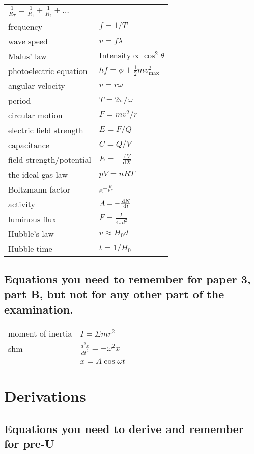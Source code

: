 \documentclass[revision-guide.tex]{subfiles}
\begin{document}
\begin{longtable}{ll}
\(\frac{1}{R_{T}} = \frac{1}{R_{1}} + \frac{1}{R_{2}} + \ldots\)\\
frequency & $f = 1/T$\\
wave speed & $v = f\lambda$\\
Malus' law & $\text{Intensity} \propto \cos^2{\theta}$\\
photoelectric equation & \(hf = \phi + \frac{1}{2}mv_{\max}^{2}\)\\
angular velocity & $v = r\omega$ \\
period & $T = 2\pi /\omega$\\
circular motion & $F = mv^2/r$\\
electric field strength & $E = F/Q$\\
capacitance & $C = Q/V$\\
field strength/potential & $E = -\frac{\text{d}V}{\text{d}{X}}$ \\
the ideal gas law & $pV = nRT$\\
Boltzmann factor & $e^{- \frac{E}{kT}}$ \\
activity & $A = -\frac{\,\mathrm{d} N}{\,\mathrm{d} t}$\\
luminous flux &\(F = \frac{L}{4\pi d^{2}}\)\\

Hubble's law &\(v \approx H_{0}d\)\\

Hubble time & $t = 1/H_{0}$\\

\end{longtable}

\subsection{Equations you need to remember for paper 3, part B, but not for any other part of the examination.}
\renewcommand*{\arraystretch}{2}
\begin{longtable}{ll}
moment of inertia & \(I = \Sigma mr^{2}\)\\
shm & \(\frac{d^{2}x}{dt^{2}} = - \omega^{2}x\)\\
& $x = A\cos{\omega t}$\\
\end{longtable}

\newpage
\section{Derivations}
\subsection{Equations you need to derive and remember for pre-U}
\end{document}
